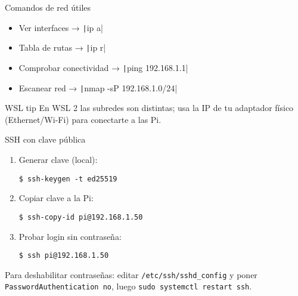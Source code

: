 \documentclass[aspectratio=169, professionalfonts]{beamer}
\begin{document}
\begin{frame}{Comandos de red útiles}
\begin{itemize}
  \item Ver interfaces → \texttt|ip a|
  \item Tabla de rutas → \texttt|ip r|
  \item Comprobar conectividad → \texttt|ping 192.168.1.1|
  \item Escanear red → \texttt|nmap -sP 192.168.1.0/24|
\end{itemize}
\pause
\begin{block}{WSL tip}
En WSL 2 las subredes son distintas; usa la IP de tu adaptador físico (Ethernet/Wi-Fi) para conectarte a las Pi.
\end{block}
\end{frame}

\begin{frame}[fragile]{SSH con clave pública}
\begin{enumerate}
  \item Generar clave (local):  
\begin{verbatim}
$ ssh-keygen -t ed25519
\end{verbatim}
  \item Copiar clave a la Pi:  
\begin{verbatim}
$ ssh-copy-id pi@192.168.1.50
\end{verbatim}
  \item Probar login sin contraseña:  
\begin{verbatim}
$ ssh pi@192.168.1.50
\end{verbatim}
\end{enumerate}
\pause
\small
{} Para deshabilitar contraseñas: editar \texttt{/etc/ssh/sshd\_config} y poner  
\texttt{PasswordAuthentication no}, luego \texttt{sudo systemctl restart ssh}.
\end{frame}


\begin{comment}

\begin{frame}{Copiar y montar carpetas remotas}
\begin{columns}[T]
\begin{column}{0.48\textwidth}
\textbf{\texttt{scp}}
\begin{verbatim}
$ scp datos.csv pi@192.168.1.50:/home/pi/
\end{verbatim}
\end{column}
\begin{column}{0.48\textwidth}
\textbf{\texttt{sshfs}}
\end{column}
\end{columns}
\pause
\centering
\texttt{[image: example-image-duck]}
\end{frame}

\end{comment}
\end{document}

